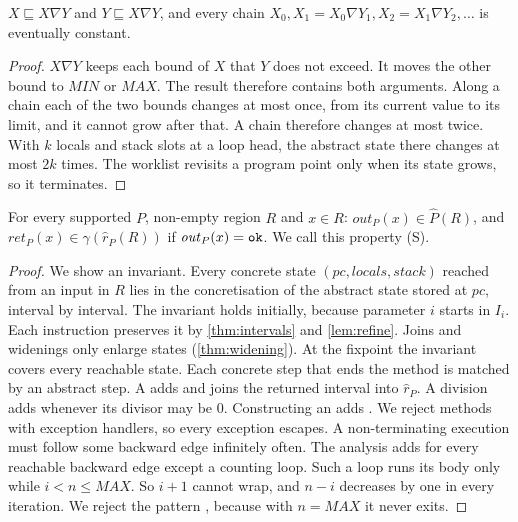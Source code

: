 \begin{theorem}
\label{thm:widening}
$X \sqsubseteq X \nabla Y$ and $Y \sqsubseteq X \nabla Y$, and every chain
$X_0, X_1 = X_0 \nabla Y_1, X_2 = X_1 \nabla Y_2, \ldots$ is eventually constant.
\end{theorem}
\begin{proof}
$X \nabla Y$ keeps each bound of $X$ that $Y$ does not exceed. It moves the other bound to
$\mathit{MIN}$ or $\mathit{MAX}$. The result therefore contains both arguments. Along a chain
each of the two bounds changes at most once, from its current value to its limit, and it
cannot grow after that. A chain therefore changes at most twice. With $k$ locals and stack
slots at a loop head, the abstract state there changes at most $2k$ times. The worklist
revisits a program point only when its state grows, so it terminates.
\end{proof}

\begin{theorem}
\label{thm:region}
For every supported $P$, non-empty region $R$ and $x \in R$:
$\mathit{out}_P(x) \in \hat P(R)$, and $\mathit{ret}_P(x) \in \gamma(\hat r_P(R))$ if
$\mathit{out}_P(x) = \texttt{ok}$. We call this property (S).
\end{theorem}
\begin{proof}
We show an invariant. Every concrete state $(\mathit{pc}, \mathit{locals}, \mathit{stack})$
reached from an input in $R$ lies in the concretisation of the abstract state stored at
$\mathit{pc}$, interval by interval. The invariant holds initially, because parameter $i$
starts in $I_i$. Each instruction preserves it by \cref{thm:intervals} and \cref{lem:refine}.
Joins and widenings only enlarge states (\cref{thm:widening}). At the fixpoint the invariant
covers every reachable state. Each concrete step that ends the method is matched by an
abstract step. A  adds \ok{} and joins the returned interval into $\hat r_P$. A
division adds \dbz{} whenever its divisor may be $0$. Constructing an 
adds . We reject methods with exception handlers, so every exception
escapes. A non-terminating execution must follow some backward edge infinitely often. The
analysis adds \code{*} for every reachable backward edge except a counting loop. Such a loop
runs its body only while $i < n \le \mathit{MAX}$. So $i + 1$ cannot wrap, and $n - i$
decreases by one in every iteration. We reject the pattern , because with
$n = \mathit{MAX}$ it never exits.
\end{proof}

